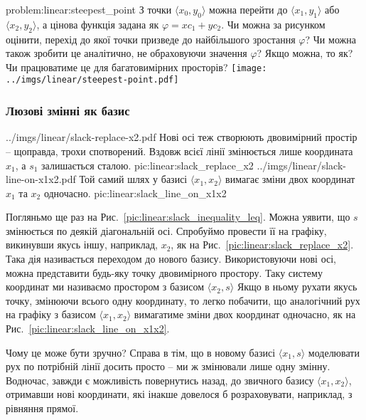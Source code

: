 \documentclass[\main/book.tex]{subfiles}
\begin{document}
\begin{problem}{problem:linear:steepest_point}
 З точки $\langle x_0, y_0 \rangle$ можна перейти до $\langle x_1, y_1 \rangle$ або $\langle x_2, y_2 \rangle$, а цінова функція задана як $\varphi = x c_1 + y c_2$. Чи можна за рисунком оцінити, перехід до якої точки призведе до найбільшого зростання $\varphi$? Чи можна також зробити це аналітично, не обраховуючи значення $\varphi$? Якщо можна, то як? Чи працюватиме це для багатовимірних просторів?
 \center
 \texttt{[image: ../imgs/linear/steepest-point.pdf]}
\end{problem}

\subsubsection{Люзові змінні як базис}

\twocolminipage
 {
  \nofigillustration
   {../imgs/linear/slack-replace-x2.pdf}
   {Нові осі теж створюють двовимірний простір -- щоправда, трохи \flqq{}спотворений\frqq. Вздовж всієї лінії змінюється лише координата $x_1$, а $s_1$ залишається сталою.}
   {pic:linear:slack_replace_x2}
 }{
  \nofigillustration
   {../imgs/linear/slack-line-on-x1x2.pdf}
   {Той самий шлях у базисі ${\langle x_1, x_2 \rangle}$ вимагає зміни двох координат $x_1$ та $x_2$ одночасно.}
   {pic:linear:slack_line_on_x1x2}
 }

Погляньмо ще раз на Рис.~\ref{pic:linear:slack_inequality_leq}. Можна уявити, що $s$ змінюється по деякій діагональній осі. Спробуймо провести її на графіку, викинувши якусь іншу, наприклад, $x_2$, як на Рис.~\ref{pic:linear:slack_replace_x2}. Така дія називається \flqq{}переходом до нового базису\frqq. Використовуючи нові осі, можна представити будь-яку точку двовимірного простору. Таку систему координат ми називаємо \flqq{}простором з базисом ${\langle x_2, s \rangle}$\frqq{} Якщо в ньому рухати якусь точку, змінюючи всього одну координату, то легко побачити, що аналогічний рух на графіку з базисом ${\langle x_1, x_2 \rangle}$ вимагатиме зміни двох координат одночасно, як на Рис.~\ref{pic:linear:slack_line_on_x1x2}.

Чому це може бути зручно? Справа в тім, що в новому базисі ${\langle x_1, s \rangle}$ моделювати рух по потрібній лінії досить просто -- ми ж змінювали лише одну змінну. Водночас, завжди є можливість повернутись назад, до звичного базису ${\langle x_1, x_2 \rangle}$, отримавши нові координати, які інакше довелося б розраховувати, наприклад, з рівняння прямої.
\end{document}
